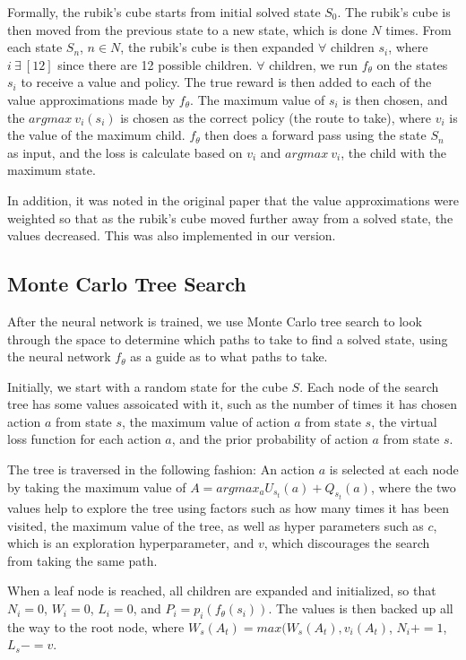 \documentclass[10pt,twocolumn,letterpaper]{article}
\begin{document}
Formally, the rubik's cube starts from initial solved state $S_0$. The rubik's cube is then moved from the previous state to a new state, which is done $N$ times. From each state $S_n$, $n \in N$, the rubik's cube is then expanded $\forall$ children $s_i$, where $i \ \exists \ [12]$ since there are 12 possible children. $\forall$ children, we run $f_\theta$ on the states $s_i$ to receive a value and policy. The true reward is then added to each of the value approximations made by $f_\theta$. 
The maximum value of $s_i$ is then chosen, and the $argmax \ v_i(s_i)$ is chosen as the correct policy (the route to take), where $v_i$ is the value of the maximum child. $f_\theta$ then does a forward pass using the state $S_n$ as input, and the loss is calculate based on $v_i$ and $argmax \ v_i$, the child with the maximum state.

In addition, it was noted in the original paper that the value approximations were weighted so that as the rubik's cube moved further away from a solved state, the values decreased. This was also implemented in our version.

\subsection{Monte Carlo Tree Search}

After the neural network is trained, we use Monte Carlo tree search to look through the space to determine which paths to take to find a solved state, using the neural network $f_\theta$ as a guide as to what paths to take. 


Initially, we start with a random state for the cube $S$. Each node of the search tree has some values assoicated with it, such as the number of times it has chosen action $a$ from state $s$, the maximum value of action $a$ from state $s$, the virtual loss function for each action $a$, and the prior probability of action $a$ from state $s$.


The tree is traversed in the following fashion: An action $a$ is selected at each node by taking the maximum value of $A=argmax_a U_{s_{t}}(a) + Q_{s_{t}}(a) $, where the two values help to explore the tree using factors such as how many times it has been visited, the maximum value of the tree, as well as hyper parameters such as $c$, which is an exploration hyperparameter, and $v$, which discourages the search from taking the same path.

When a leaf node is reached, all children are expanded and initialized, so that $N_i = 0$, $W_i = 0$, $L_i = 0$, and $P_i = p_i(f_\theta (s_i))$. The values is  then backed up all the way to the root node, where $W_s(A_t) = max(W_s(A_t), v_i(A_t)$, $N_i += 1$, $L_s -= v$.
\end{document}

